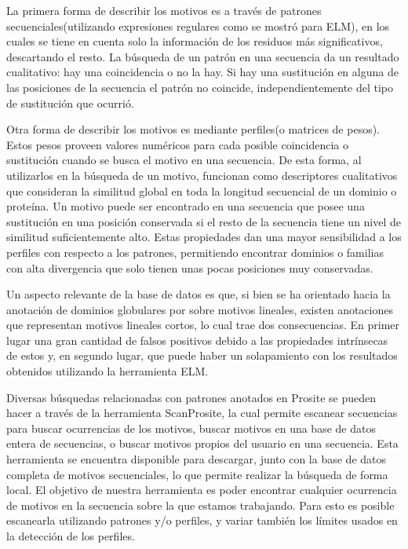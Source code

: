 La primera forma de describir los motivos es a través de patrones secuenciales(utilizando expresiones regulares como se mostró para ELM),
en los cuales se tiene en cuenta solo la información de los residuos más significativos, descartando el resto. 
La búsqueda de un patrón en una secuencia da un resultado cualitativo: hay una coincidencia o no la hay. 
Si hay una sustitución en alguna de las posiciones de la secuencia el patrón no coincide, independientemente del tipo de sustitución que ocurrió.

Otra forma de describir los motivos es mediante perfiles(o matrices de pesos). Estos pesos proveen valores numéricos para cada posible coincidencia o sustitución cuando se busca el motivo en una secuencia. 
De esta forma, al utilizarlos en la búsqueda de un motivo, funcionan como descriptores cualitativos que consideran la similitud global en toda la longitud secuencial de un dominio o proteína. 
Un motivo puede ser encontrado en una secuencia que posee una sustitución en una posición conservada si el resto de la secuencia tiene un nivel de similitud suficientemente alto.
Estas propiedades dan una mayor sensibilidad a los perfiles con respecto a los patrones, permitiendo encontrar dominios o familias con alta divergencia que solo tienen unas pocas posiciones muy conservadas.

Un aspecto relevante de la base de datos es que, si bien se ha orientado hacia la anotación de dominios globulares por sobre motivos lineales, existen anotaciones que representan motivos lineales cortos, lo cual trae dos consecuencias. 
En primer lugar una gran cantidad de falsos positivos debido a las propiedades intrínsecas de estos y, en segundo lugar, que puede haber un solapamiento con los resultados obtenidos utilizando la herramienta ELM.

Diversas búsquedas relacionadas con patrones anotados en Prosite se pueden hacer a través de la herramienta ScanProsite\cite{de2006scanprosite,scanprositeWeb}, 
la cual permite escanear secuencias para buscar ocurrencias de los motivos, buscar motivos en una base de datos entera de secuencias, o buscar motivos propios del usuario en una secuencia.
Esta herramienta se encuentra disponible para descargar, junto con la base de datos completa de motivos secuenciales, lo que permite realizar la búsqueda de forma local.
El objetivo de nuestra herramienta es poder encontrar cualquier ocurrencia de motivos en la secuencia sobre la que estamos trabajando. 
Para esto es posible escanearla utilizando patrones y/o perfiles, y variar también los límites usados en la detección de los perfiles. 

